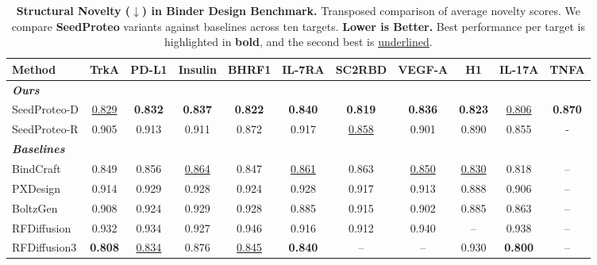 \begin{table}[t]
\centering
\setlength{\tabcolsep}{4.5pt}
\renewcommand{\arraystretch}{1.0}

\caption{\textbf{Structural Novelty ($\downarrow$) in Binder Design Benchmark.} Transposed comparison of average novelty scores. We compare \textbf{SeedProteo} variants against baselines across ten targets. \textbf{Lower is Better.} Best performance per target is highlighted in \textbf{bold}, and the second best is \underline{underlined}.}
\label{tab:novelty}

\begin{tabular}{l cccccccccc}
\toprule
\textbf{Method} & \textbf{TrkA} & \textbf{PD-L1} & \textbf{Insulin} & \textbf{BHRF1} & \textbf{IL-7RA} & \textbf{SC2RBD} & \textbf{VEGF-A} & \textbf{H1} & \textbf{IL-17A} & \textbf{TNFA} \\
\midrule
\multicolumn{11}{l}{\textit{\textbf{Ours}}} \\
SeedProteo-D & \underline{0.829} & \textbf{0.832} & \textbf{0.837} & \textbf{0.822} & \textbf{0.840} & \textbf{0.819} & \textbf{0.836} & \textbf{0.823} & \underline{0.806} & \textbf{0.870} \\
SeedProteo-R & 0.905 & 0.913 & 0.911 & 0.872 & 0.917 & \underline{0.858} & 0.901 & 0.890 & 0.855 & - \\
\midrule
\multicolumn{11}{l}{\textit{\textbf{Baselines}}} \\
BindCraft    & 0.849 & 0.856 & \underline{0.864} & 0.847 & \underline{0.861} & 0.863 & \underline{0.850} & \underline{0.830} & 0.818 & -- \\
PXDesign     & 0.914 & 0.929 & 0.928 & 0.924 & 0.928 & 0.917 & 0.913 & 0.888 & 0.906 & -- \\
BoltzGen     & 0.908 & 0.924 & 0.929 & 0.928 & 0.885 & 0.915 & 0.902 & 0.885 & 0.863 & -- \\
RFDiffusion  & 0.932 & 0.934 & 0.927 & 0.946 & 0.916 & 0.912 & 0.940 & --    & 0.938 & -- \\
RFDiffusion3 & \textbf{0.808} & \underline{0.834} & 0.876 & \underline{0.845} & \textbf{0.840} & -- & -- & 0.930 & \textbf{0.800} & -- \\
\bottomrule
\end{tabular}
\end{table}